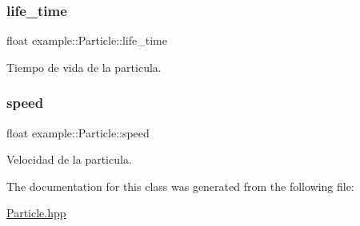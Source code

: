\subsubsection{\texorpdfstring{life\_time}{life\_time}}
{\footnotesize\ttfamily float example\+::\+Particle\+::life\+\_\+time\hspace{0.3cm}{\ttfamily [protected]}}



Tiempo de vida de la particula. 

\mbox{\label{classexample_1_1_particle_a736704d02529ef3e2e4dc4f91c928cd4}} 
\subsubsection{\texorpdfstring{speed}{speed}}
{\footnotesize\ttfamily float example\+::\+Particle\+::speed\hspace{0.3cm}{\ttfamily [protected]}}



Velocidad de la particula. 



The documentation for this class was generated from the following file\+:\begin{DoxyCompactItemize}
\item 
\mbox{\hyperlink{_particle_8hpp}{Particle.\+hpp}}\end{DoxyCompactItemize}
